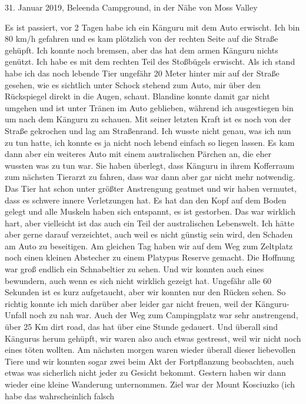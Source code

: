 \documentclass[11pt]{book}
\begin{document}
31. Januar 2019, Beleenda Campground, in der Nähe von Moss Valley

Es ist passiert, vor 2 Tagen habe ich ein Känguru mit dem Auto erwischt. Ich bin 80 km/h gefahren und es kam plötzlich von 
der rechten Seite auf die Straße gehüpft. Ich konnte noch bremsen, aber das hat dem armen Känguru nichts genützt. Ich habe es mit 
dem rechten Teil des Stoßbügels erwischt. Als ich stand habe ich das noch lebende Tier ungefähr 20 Meter hinter mir auf der 
Straße gesehen, wie es sichtlich unter Schock stehend zum Auto, mir über den Rückspiegel direkt in die Augen, schaut. Blandine 
konnte damit gar nicht umgehen und ist unter Tränen im Auto geblieben, während ich ausgestiegen bin um nach dem Känguru zu schauen.
Mit seiner letzten Kraft ist es noch von der Straße gekrochen und lag am Straßenrand. Ich wusste nicht genau, was ich nun zu tun hatte,
ich konnte es ja nicht noch lebend einfach so liegen lassen. Es kam dann aber ein weiteres Auto mit einem australischen Pärchen 
an, die eher wussten was zu tun war. Sie haben überlegt, dass Känguru in ihrem Kofferraum zum nächsten Tierarzt zu fahren, dass 
war dann aber gar nicht mehr notwendig. Das Tier hat schon unter größter Anstrengung geatmet und wir haben vermutet, dass es 
schwere innere Verletzungen hat. Es hat dan den Kopf auf dem Boden gelegt und alle Muskeln haben sich entspannt, es ist gestorben.
Das war wirklich hart, aber vielleicht ist das auch ein Teil der australischen Lebenswelt. Ich hätte aber gerne darauf verzeichtet, 
auch weil es nicht günstig sein wird, den Schaden am Auto zu beseitigen. 
Am gleichen Tag haben wir auf dem Weg zum Zeltplatz noch einen kleinen Abstecher zu einem Platypus Reserve gemacht. Die Hoffnung 
war groß endlich ein Schnabeltier zu sehen. Und wir konnten auch eines bewundern, auch wenn es sich nicht wirklich gezeigt hat. 
Ungefähr alle 60 Sekunden ist es kurz aufgetaucht, aber wir konnten nur den Rücken sehen. So richtig konnte ich mich darüber 
aber leider gar nicht freuen, weil der Känguru-Unfall noch zu nah war. Auch der Weg zum Campingplatz war sehr anstrengend, über 25 Km 
dirt road, das hat über eine Stunde gedauert. Und überall sind Kängurus herum gehüpft, wir waren also auch etwas gestresst, weil wir 
nicht noch eines töten wollten. Am nächsten morgen waren wieder überall dieser liebevollen Tiere und wir konnten sogar zwei 
beim Akt der Fortpflanzung beobachten, auch etwas was sicherlich nicht jeder zu Gesicht bekommt.
Gestern haben wir dann wieder eine kleine Wanderung unternommen. Ziel war der Mount Kosciuzko (ich habe das wahrscheinlich falsch 
\end{document}
